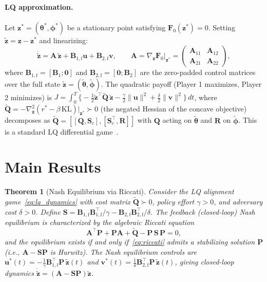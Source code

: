 \documentclass[10pt]{article}
\newcommand{\btheta}{\bm{\theta}}
\newcommand{\bphi}{\bm{\phi}}
\newcommand{\bz}{\bm{z}}
\newcommand{\bu}{\bm{u}}
\newcommand{\bv}{\bm{v}}
\newcommand{\bA}{\bm{A}}
\newcommand{\bB}{\bm{B}}
\newcommand{\bP}{\bm{P}}
\newcommand{\bQ}{\bm{Q}}
\newcommand{\bR}{\bm{R}}
\newcommand{\bF}{\bm{F}}
\newcommand{\bS}{\bm{S}}
\newcommand{\KL}{\mathrm{KL}}
\newtheorem{theorem}{Theorem}
\begin{document}
\paragraph{LQ approximation.}
Let $\bz^* = (\btheta^*, \bphi^*)$ be a stationary point satisfying $\bF_0(\bz^*) = 0$.
Setting $\tilde{\bz} = \bz - \bz^*$ and linearizing:
\begin{equation}
  \dot{\tilde{\bz}} = \bA\,\tilde{\bz} + \bB_{1,\mathrm{f}} \bu + \bB_{2,\mathrm{f}} \bv, \qquad
  \bA = \nabla_\bz \bF_0\big|_{\bz^*} =
  \begin{pmatrix}
    \bA_{11} & \bA_{12} \\
    \bA_{21} & \bA_{22}
  \end{pmatrix},
  \label{eq:lq_dynamics}
\end{equation}
where $\bB_{1,\mathrm{f}} = [\bB_1; \bm{0}]$ and $\bB_{2,\mathrm{f}} = [\bm{0}; \bB_2]$ are the zero-padded control matrices over the full state $\tilde{\bz} = (\tilde{\btheta}, \tilde{\bphi})$.
The quadratic payoff (Player 1 maximizes, Player 2 minimizes) is $J = \int_0^T \bigl\{-\tfrac{1}{2}\tilde{\bz}^\top \widetilde{\bQ}\,\tilde{\bz} - \tfrac{\gamma}{2}\|\bu\|^2 + \tfrac{\delta}{2}\|\bv\|^2\bigr\}\,dt$, where $\widetilde{\bQ} = -\nabla^2_\bz(r^* - \beta\,\KL)\big|_{\bz^*} \succ 0$ (the negated Hessian of the concave objective) decomposes as $\widetilde{\bQ} = [[\bQ, \bm{S}_c],[\bm{S}_c^\top, \bR]]$ with $\bQ$ acting on $\tilde{\btheta}$ and $\bR$ on $\tilde{\bphi}$.
This is a standard LQ differential game~\citep{basar1999dynamic}.

\section{Main Results}
\label{sec:results}

\begin{theorem}[Nash Equilibrium via Riccati]
\label{thm:riccati}
Consider the LQ alignment game~\eqref{eq:lq_dynamics} with cost matrix $\widetilde{\bQ} \succ 0$, policy effort $\gamma > 0$, and adversary cost $\delta > 0$.
Define $\bS = \bB_{1,\mathrm{f}}\bB_{1,\mathrm{f}}^\top/\gamma - \bB_{2,\mathrm{f}}\bB_{2,\mathrm{f}}^\top/\delta$.
The feedback (closed-loop) Nash equilibrium is characterized by the algebraic Riccati equation
\begin{equation}
  \bA^\top \bP + \bP\bA + \widetilde{\bQ} - \bP\,\bS\,\bP = 0,
  \label{eq:riccati}
\end{equation}
and the equilibrium exists if and only if~\eqref{eq:riccati} admits a stabilizing solution $\bP$ (i.e., $\bA - \bS\bP$ is Hurwitz).
The Nash equilibrium controls are $\bu^*(t) = -\frac{1}{\gamma}\bB_{1,\mathrm{f}}^\top \bP\,\tilde{\bz}(t)$ and $\bv^*(t) = \frac{1}{\delta}\bB_{2,\mathrm{f}}^\top \bP\,\tilde{\bz}(t)$, giving closed-loop dynamics $\dot{\tilde{\bz}} = (\bA - \bS\bP)\tilde{\bz}$.
\end{theorem}
\end{document}
